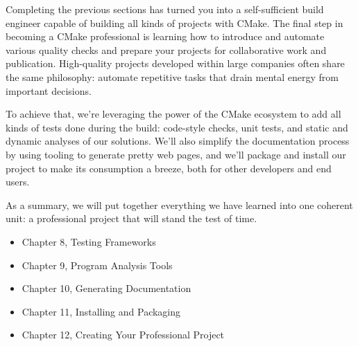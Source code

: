 

Completing the previous sections has turned you into a self-sufficient build engineer capable of building all kinds of projects with CMake. The final step in becoming a CMake professional is learning how to introduce and automate various quality checks and prepare your projects for collaborative work and publication. High-quality projects developed within large companies often share the same philosophy: automate repetitive tasks that drain mental energy from important decisions.

To achieve that, we're leveraging the power of the CMake ecosystem to add all kinds of tests done during the build: code-style checks, unit tests, and static and dynamic analyses of our solutions. We'll also simplify the documentation process by using tooling to generate pretty web pages, and we'll package and install our project to make its consumption a breeze, both for other developers and end users.

As a summary, we will put together everything we have learned into one coherent
unit: a professional project that will stand the test of time.

\begin{itemize}
\item Chapter 8, Testing Frameworks
\item Chapter 9, Program Analysis Tools
\item Chapter 10, Generating Documentation
\item Chapter 11, Installing and Packaging
\item Chapter 12, Creating Your Professional Project
\end{itemize}